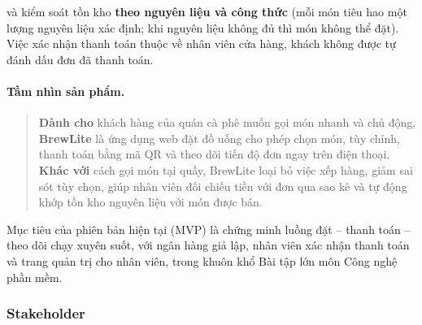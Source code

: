 và kiểm soát tồn kho \textbf{theo nguyên liệu và công thức} (mỗi món tiêu hao một lượng nguyên liệu xác định; khi nguyên liệu không đủ thì món không thể đặt). Việc xác nhận thanh toán thuộc về nhân viên cửa hàng, khách không được tự đánh dấu đơn đã thanh toán.

\paragraph{Tầm nhìn sản phẩm.}
\begin{quote}
\textbf{Dành cho} khách hàng của quán cà phê muốn gọi món nhanh và chủ động, \textbf{BrewLite} là ứng dụng web đặt đồ uống cho phép chọn món, tùy chỉnh, thanh toán bằng mã QR và theo dõi tiến độ đơn ngay trên điện thoại. \textbf{Khác với} cách gọi món tại quầy, BrewLite loại bỏ việc xếp hàng, giảm sai sót tùy chọn, giúp nhân viên đối chiếu tiền với đơn qua sao kê và tự động khớp tồn kho nguyên liệu với món được bán.
\end{quote}

Mục tiêu của phiên bản hiện tại (MVP) là chứng minh luồng đặt -- thanh toán -- theo dõi chạy xuyên suốt, với ngân hàng giả lập, nhân viên xác nhận thanh toán và trang quản trị cho nhân viên, trong khuôn khổ Bài tập lớn môn Công nghệ phần mềm.

\subsubsection{Stakeholder}


